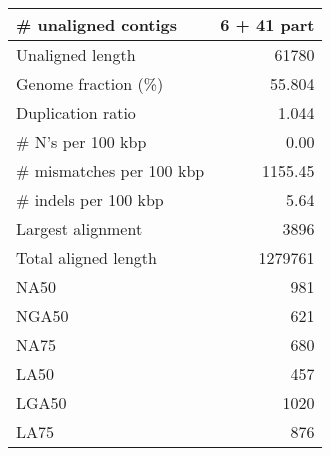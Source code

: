 \documentclass[12pt,a4paper]{article}
\begin{document}
\begin{table}[ht]
\begin{center}
\begin{tabular}{|l*{1}{|r}|}
\# unaligned contigs & 6 + 41 part \\ \hline
Unaligned length & 61780 \\ \hline
Genome fraction (\%) & 55.804 \\ \hline
Duplication ratio & 1.044 \\ \hline
\# N's per 100 kbp & 0.00 \\ \hline
\# mismatches per 100 kbp & 1155.45 \\ \hline
\# indels per 100 kbp & 5.64 \\ \hline
Largest alignment & 3896 \\ \hline
Total aligned length & 1279761 \\ \hline
NA50 & 981 \\ \hline
NGA50 & 621 \\ \hline
NA75 & 680 \\ \hline
LA50 & 457 \\ \hline
LGA50 & 1020 \\ \hline
LA75 & 876 \\ \hline
\end{tabular}
\end{center}
\end{table}
\end{document}
